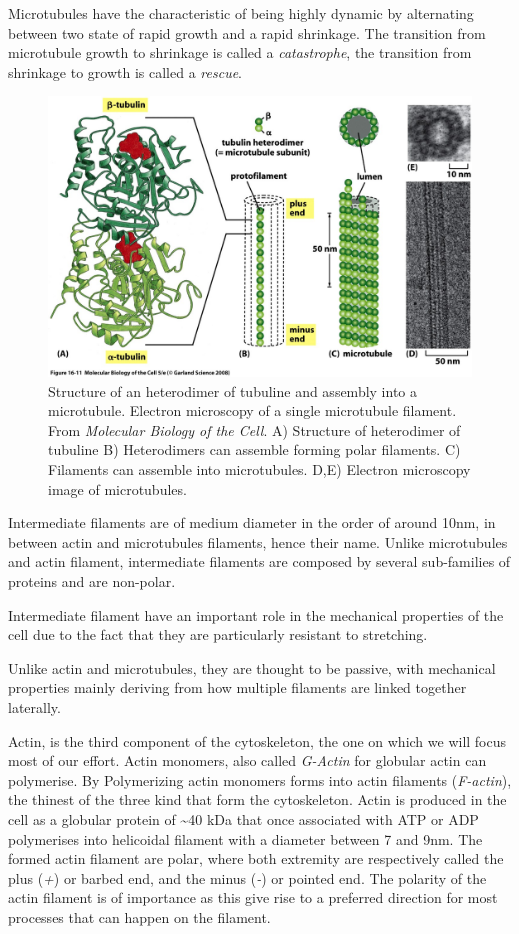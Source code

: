 \documentclass[A4paperpaper,11pt,english]{sphinxmanual}
\begin{document}
Microtubules have the characteristic of being highly dynamic by alternating
between two state of rapid growth and a rapid shrinkage. The transition from
microtubule growth to shrinkage is called a \emph{catastrophe}, the transition from
shrinkage to growth is called a \emph{rescue}.
\begin{figure}[htbp]
\centering
\capstart

\includegraphics[width=0.700\linewidth]{microtubules-structure.jpg}
\caption{Structure of an heterodimer of tubuline and assembly into a microtubule.
Electron microscopy of a single microtubule filament. From \emph{Molecular
Biology of the Cell}. A) Structure of heterodimer of tubuline B)
Heterodimers can assemble forming polar filaments. C) Filaments can
assemble into  microtubules. D,E) Electron microscopy image of
microtubules.}\label{parts/part1:fig-mt}\end{figure}

Intermediate filaments are of medium diameter in the order of around 10nm, in
between actin and microtubules filaments, hence their name.  Unlike microtubules
and actin filament, intermediate filaments are composed by several sub-families
of proteins and are non-polar.

Intermediate filament have an important role in the mechanical properties of
the cell due to the fact that they are particularly  resistant to stretching.

Unlike actin and microtubules, they are thought to be passive, with mechanical
properties mainly deriving from how multiple filaments are linked together
laterally.

Actin, is the third component of the cytoskeleton, the one on which  we will
focus most of our effort. Actin monomers, also called \emph{G-Actin} for globular actin can polymerise. By Polymerizing actin monomers forms into actin filaments (\emph{F-actin}), the
thinest of the three kind that form the cytoskeleton. Actin is produced in the
cell as a globular protein of \textasciitilde{}40 kDa that once associated with ATP or ADP
polymerises into helicoidal filament with a diameter between 7 and 9nm. The
formed actin filament are polar, where both extremity are respectively called the
plus (\emph{+}) or barbed end, and the minus (\emph{-}) or pointed end. The polarity of
the actin filament is of importance as this give rise to a preferred direction
for most processes that can happen on the filament.
\end{document}
